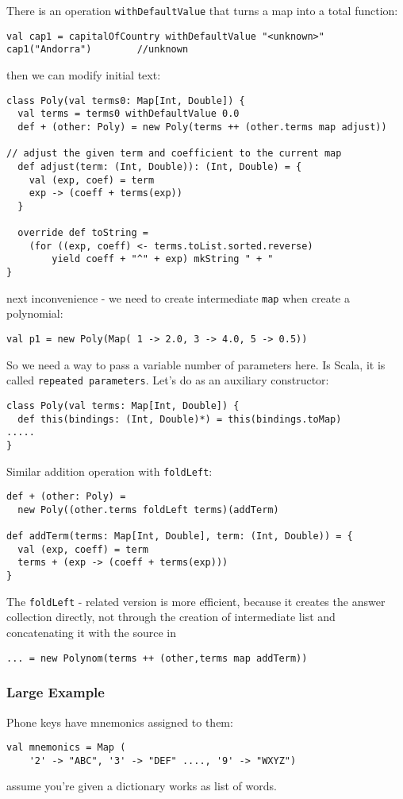 \documentclass{scrartcl}
\newcommand{\term}[1]{\verb~#1~} %
\begin{document}
There is an operation \lstinline|withDefaultValue| that turns a map into a total
function:
\begin{lstlisting}
val cap1 = capitalOfCountry withDefaultValue "<unknown>"
cap1("Andorra")        //unknown
\end{lstlisting}
 then we can modify initial text:
\begin{lstlisting}
class Poly(val terms0: Map[Int, Double]) {
  val terms = terms0 withDefaultValue 0.0
  def + (other: Poly) = new Poly(terms ++ (other.terms map adjust))

// adjust the given term and coefficient to the current map
  def adjust(term: (Int, Double)): (Int, Double) = {
    val (exp, coef) = term
    exp -> (coeff + terms(exp))
  }

  override def toString = 
    (for ((exp, coeff) <- terms.toList.sorted.reverse) 
        yield coeff + "^" + exp) mkString " + "
}
\end{lstlisting}
next inconvenience - we need to create intermediate \lstinline|map| when create
a polynomial:
\begin{lstlisting}
val p1 = new Poly(Map( 1 -> 2.0, 3 -> 4.0, 5 -> 0.5))
\end{lstlisting}
So we need a way to pass a variable number of parameters here. Is Scala, it is
called \term{repeated parameters}. Let's do as an auxiliary constructor:
\begin{lstlisting}
class Poly(val terms: Map[Int, Double]) {
  def this(bindings: (Int, Double)*) = this(bindings.toMap)
.....  
}
\end{lstlisting}

Similar addition operation with \lstinline|foldLeft|:
\begin{lstlisting}
def + (other: Poly) = 
  new Poly((other.terms foldLeft terms)(addTerm)

def addTerm(terms: Map[Int, Double], term: (Int, Double)) = {
  val (exp, coeff) = term
  terms + (exp -> (coeff + terms(exp)))
}
\end{lstlisting}

The \lstinline|foldLeft| - related version is more efficient, because it creates
the answer collection directly, not through the creation of intermediate list
and concatenating it with the source in 
\begin{lstlisting}
... = new Polynom(terms ++ (other,terms map addTerm))
\end{lstlisting}

\subsubsection{Large Example}
\label{sec:ExampleFindingFixedPoint}
Phone keys have mnemonics assigned to them:
\begin{lstlisting}
val mnemonics = Map (
    '2' -> "ABC", '3' -> "DEF" ...., '9' -> "WXYZ")
\end{lstlisting}
assume you're given a dictionary works as list of words.
\end{document}

